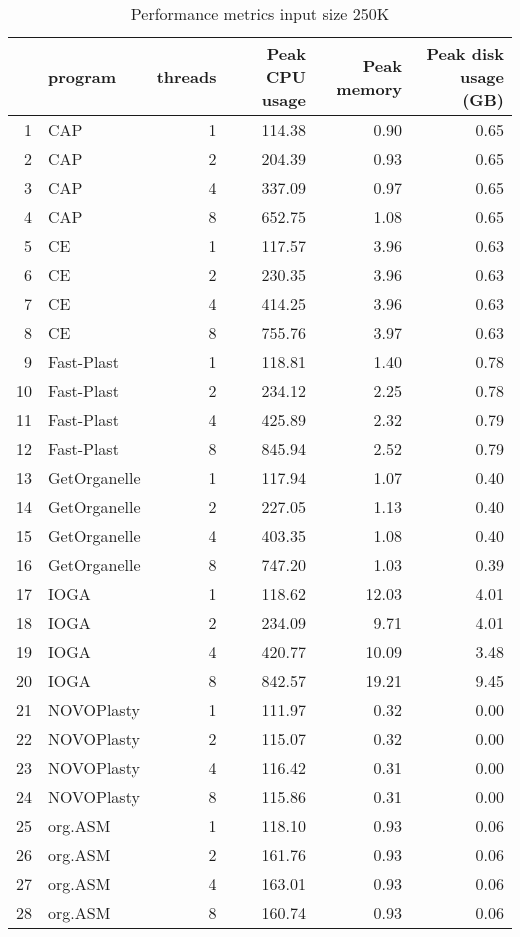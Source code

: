 \documentclass[oneside,10pt,A4]{scrartcl}
\begin{document}
\begin{table}[ht]
\caption{Performance metrics input size 250K}
\label{tab:perform250K_suppl}
\centering
\begin{tabular}{rlrrrr}
  \toprule
 & program & threads & Peak CPU usage & Peak memory & Peak disk usage (GB) \\ 
  \midrule
1 & CAP &   1 & 114.38 & 0.90 & 0.65 \\ 
  2 & CAP &   2 & 204.39 & 0.93 & 0.65 \\ 
  3 & CAP &   4 & 337.09 & 0.97 & 0.65 \\ 
  4 & CAP &   8 & 652.75 & 1.08 & 0.65 \\ 
  5 & CE &   1 & 117.57 & 3.96 & 0.63 \\ 
  6 & CE &   2 & 230.35 & 3.96 & 0.63 \\ 
  7 & CE &   4 & 414.25 & 3.96 & 0.63 \\ 
  8 & CE &   8 & 755.76 & 3.97 & 0.63 \\ 
  9 & Fast-Plast &   1 & 118.81 & 1.40 & 0.78 \\ 
  10 & Fast-Plast &   2 & 234.12 & 2.25 & 0.78 \\ 
  11 & Fast-Plast &   4 & 425.89 & 2.32 & 0.79 \\ 
  12 & Fast-Plast &   8 & 845.94 & 2.52 & 0.79 \\ 
  13 & GetOrganelle &   1 & 117.94 & 1.07 & 0.40 \\ 
  14 & GetOrganelle &   2 & 227.05 & 1.13 & 0.40 \\ 
  15 & GetOrganelle &   4 & 403.35 & 1.08 & 0.40 \\ 
  16 & GetOrganelle &   8 & 747.20 & 1.03 & 0.39 \\ 
  17 & IOGA &   1 & 118.62 & 12.03 & 4.01 \\ 
  18 & IOGA &   2 & 234.09 & 9.71 & 4.01 \\ 
  19 & IOGA &   4 & 420.77 & 10.09 & 3.48 \\ 
  20 & IOGA &   8 & 842.57 & 19.21 & 9.45 \\ 
  21 & NOVOPlasty &   1 & 111.97 & 0.32 & 0.00 \\ 
  22 & NOVOPlasty &   2 & 115.07 & 0.32 & 0.00 \\ 
  23 & NOVOPlasty &   4 & 116.42 & 0.31 & 0.00 \\ 
  24 & NOVOPlasty &   8 & 115.86 & 0.31 & 0.00 \\ 
  25 & org.ASM &   1 & 118.10 & 0.93 & 0.06 \\ 
  26 & org.ASM &   2 & 161.76 & 0.93 & 0.06 \\ 
  27 & org.ASM &   4 & 163.01 & 0.93 & 0.06 \\ 
  28 & org.ASM &   8 & 160.74 & 0.93 & 0.06 \\ 
   \bottomrule
\end{tabular}
\end{table}
\end{document}
